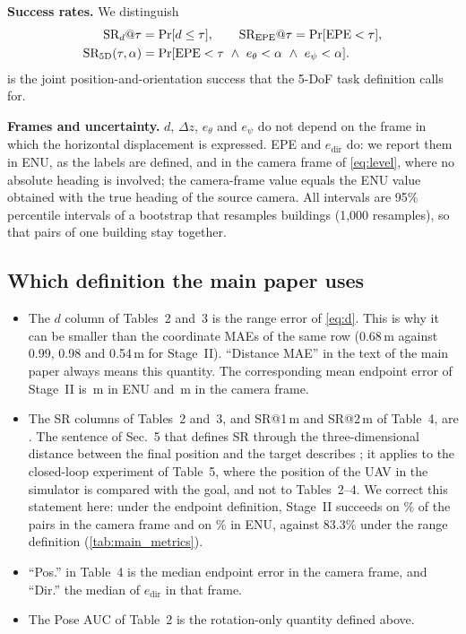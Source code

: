 \noindent\textbf{Success rates.} We distinguish
\begin{align}
\text{\SRd}@\tau&=\Pr[d\le\tau],\qquad \text{\SRe}@\tau=\Pr[\mathrm{EPE}<\tau],\\
\text{\SRf}(\tau,\alpha)&=\Pr[\mathrm{EPE}<\tau\ \wedge\ e_\theta<\alpha\ \wedge\ e_\psi<\alpha].
\end{align}
\SRf{} is the joint position-and-orientation success that the 5-DoF task definition calls for.

\noindent\textbf{Frames and uncertainty.} $d$, $\Delta z$, $e_\theta$ and $e_\psi$ do not depend on the frame in which the horizontal displacement is expressed. EPE and $e_{\mathrm{dir}}$ do: we report them in ENU, as the labels are defined, and in the camera frame of \cref{eq:level}, where no absolute heading is involved; the camera-frame value equals the ENU value obtained with the true heading of the source camera. All intervals are 95\% percentile intervals of a bootstrap that resamples buildings (1{,}000 resamples), so that pairs of one building stay together.

\subsection{Which definition the main paper uses}
\label{sec:whichdef}

\begin{itemize}[leftmargin=*,itemsep=1pt,topsep=2pt]
\item The $d$ column of Tables~2 and~3 is the range error of \cref{eq:d}. This is why it can be smaller than the coordinate MAEs of the same row (0.68\,m against 0.99, 0.98 and 0.54\,m for Stage~II). ``Distance MAE'' in the text of the main paper always means this quantity. The corresponding mean endpoint error of Stage~II is \SiiEnuEPEmean\,m in ENU and \SiiCamEPEmean\,m in the camera frame.
\item The SR columns of Tables~2 and~3, and SR@1\,m and SR@2\,m of Table~4, are \SRd. The sentence of Sec.~5 that defines SR through the three-dimensional distance between the final position and the target describes \SRe; it applies to the closed-loop experiment of Table~5, where the position of the UAV in the simulator is compared with the goal, and not to Tables~2--4. We correct this statement here: under the endpoint definition, Stage~II succeeds on \SiiCamSRe\% of the pairs in the camera frame and on \SiiEnuSRe\% in ENU, against 83.3\% under the range definition (\cref{tab:main_metrics}).
\item ``Pos.'' in Table~4 is the median endpoint error in the camera frame, and ``Dir.'' the median of $e_{\mathrm{dir}}$ in that frame.
\item The Pose AUC of Table~2 is the rotation-only quantity defined above.
\end{itemize}

